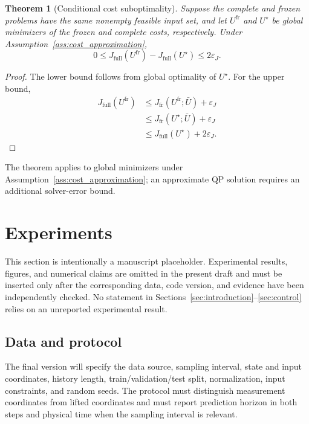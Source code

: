 \documentclass[journal]{IEEEtran}
\newtheorem{theorem}{Theorem}
\begin{document}
\begin{theorem}[Conditional cost suboptimality]
\label{thm:suboptimality}
Suppose the complete and frozen problems have the same nonempty feasible input set, and let $U^{\mathrm{fr}}$ and $U^\star$ be global minimizers of the frozen and complete costs, respectively. Under Assumption~\ref{ass:cost_approximation},
\begin{equation}
    0\le J_{\mathrm{full}}(U^{\mathrm{fr}})-J_{\mathrm{full}}(U^\star)
    \le2\varepsilon_J.
    \label{eq:suboptimality_bound}
\end{equation}
\end{theorem}
\begin{proof}
The lower bound follows from global optimality of $U^\star$. For the upper bound,
\begin{align*}
J_{\mathrm{full}}(U^{\mathrm{fr}})
&\le J_{\mathrm{fr}}(U^{\mathrm{fr}};\bar U)+\varepsilon_J\\
&\le J_{\mathrm{fr}}(U^\star;\bar U)+\varepsilon_J\\
&\le J_{\mathrm{full}}(U^\star)+2\varepsilon_J.
\end{align*}
\end{proof}

The theorem applies to global minimizers under Assumption~\ref{ass:cost_approximation}; an approximate QP solution requires an additional solver-error bound.

\section{Experiments}
\label{sec:experiments}

This section is intentionally a manuscript placeholder. Experimental results, figures, and numerical claims are omitted in the present draft and must be inserted only after the corresponding data, code version, and evidence have been independently checked. No statement in Sections~\ref{sec:introduction}--\ref{sec:control} relies on an unreported experimental result.

\subsection{Data and protocol}

The final version will specify the data source, sampling interval, state and input coordinates, history length, train/validation/test split, normalization, input constraints, and random seeds. The protocol must distinguish measurement coordinates from lifted coordinates and must report prediction horizon in both steps and physical time when the sampling interval is relevant.
\end{document}
